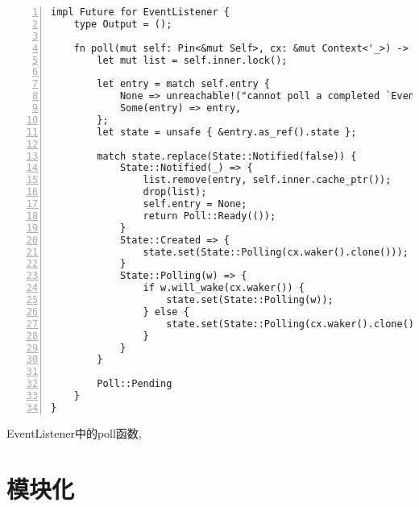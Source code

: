 \begin{lstlisting}[caption=Event的事件监听机制, numbers=left]
impl Future for EventListener {
    type Output = ();

    fn poll(mut self: Pin<&mut Self>, cx: &mut Context<'_>) -> Poll<Self::Output> {
        let mut list = self.inner.lock();

        let entry = match self.entry {
            None => unreachable!("cannot poll a completed `EventListener` future"),
            Some(entry) => entry,
        };
        let state = unsafe { &entry.as_ref().state };

        match state.replace(State::Notified(false)) {
            State::Notified(_) => {
                list.remove(entry, self.inner.cache_ptr());
                drop(list);
                self.entry = None;
                return Poll::Ready(());
            }
            State::Created => {
                state.set(State::Polling(cx.waker().clone()));
            }
            State::Polling(w) => {
                if w.will_wake(cx.waker()) {
                    state.set(State::Polling(w));
                } else {
                    state.set(State::Polling(cx.waker().clone()));
                }
            }
        }

        Poll::Pending
    }
}
\end{lstlisting}

EventListener中的poll函数, 

\section{模块化}